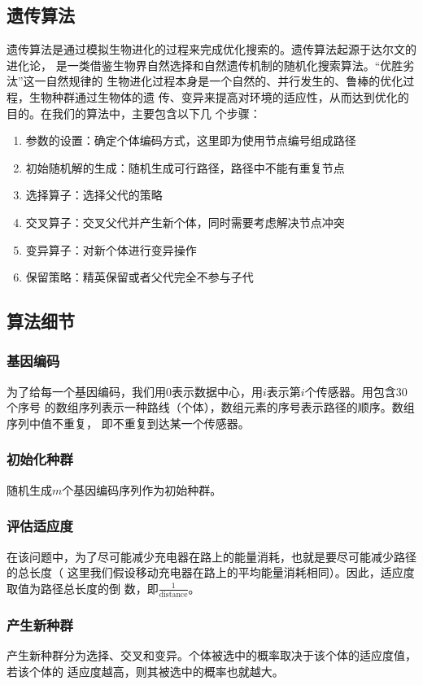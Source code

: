 \documentclass{ctexart}
\begin{document}
    \subsection{遗传算法}
    遗传算法是通过模拟生物进化的过程来完成优化搜索的。遗传算法起源于达尔文的进化论，
    是一类借鉴生物界自然选择和自然遗传机制的随机化搜索算法。“优胜劣汰”这一自然规律的
    生物进化过程本身是一个自然的、并行发生的、鲁棒的优化过程，生物种群通过生物体的遗
    传、变异来提高对环境的适应性，从而达到优化的目的。在我们的算法中，主要包含以下几
    个步骤：
    \begin{enumerate}[a]
        \item 参数的设置：确定个体编码方式，这里即为使用节点编号组成路径
        \item 初始随机解的生成：随机生成可行路径，路径中不能有重复节点
        \item 选择算子：选择父代的策略
        \item 交叉算子：交叉父代并产生新个体，同时需要考虑解决节点冲突
        \item 变异算子：对新个体进行变异操作
        \item 保留策略：精英保留或者父代完全不参与子代
    \end{enumerate}

    \subsection{算法细节}
    \subsubsection{基因编码}
    为了给每一个基因编码，我们用0表示数据中心，用$i$表示第$i$个传感器。用包含30个序号
    的数组序列表示一种路线（个体），数组元素的序号表示路径的顺序。数组序列中值不重复，
    即不重复到达某一个传感器。
    \subsubsection{初始化种群}
    随机生成$m$个基因编码序列作为初始种群。
    \subsubsection{评估适应度}
    在该问题中，为了尽可能减少充电器在路上的能量消耗，也就是要尽可能减少路径的总长度（
    这里我们假设移动充电器在路上的平均能量消耗相同）。因此，适应度取值为路径总长度的倒
    数，即$\frac{1}{\mbox{distance}}$。
    \subsubsection{产生新种群}
    产生新种群分为选择、交叉和变异。个体被选中的概率取决于该个体的适应度值，若该个体的
    适应度越高，则其被选中的概率也就越大。
\end{document}
